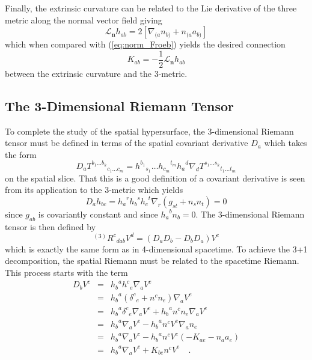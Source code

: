 \documentclass[twocolumn]{article}
\def\.{{\quad .}}
\begin{document}
Finally, the extrinsic curvature can be related to the Lie derivative of the
three metric along the normal vector field giving
\[
   {\mathcal L}_{\mathbf{n}} h_{ab} = 2 \left[ \nabla_{(a} n_{b)} + n_{(a}a_{b)} \right]
\]
which when compared with (\ref{eq:norm_Froeb}) yields the desired connection
\begin{equation}\label{eq:Lie_K}
   K_{ab} = - \frac{1}{2} {\mathcal L}_{\mathbf{n}} h_{ab}
\end{equation}
between the extrinsic curvature and the 3-metric.


\subsection{The 3-Dimensional Riemann Tensor}
To complete the study of the spatial hypersurface, the 3-dimensional Riemann
tensor must be defined in terms of the spatial covariant derivative $D_a$ which
takes the form
\[
   D_a {T^{b_1 \ldots b_k}}_{c_1 \ldots c_m} = {h^{b_1}}_{s_1}
                                               \ldots {h_{c_m}}^{t_m} {h_a}^{d}
                                               \nabla_d
                                               {T^{s_1 \ldots s_k}}_{t_1 \ldots t_m}
\]
on the spatial slice.  That this is a good definition of a covariant derivative
is seen from its application to the 3-metric which yields
\[
   D_a h_{bc} = {h_a}^{r} {h_b}^s {h_c}^t \nabla_r
                \left( g_{st} + n_s n_t \right) = 0
\]
since $g_{ab}$ is covariantly constant and since ${h_a}^b n_b = 0$.  The
3-dimensional Riemann tensor is then defined by
\begin{equation}\label{eq:3_d_Riemann}
   {}^{(3)}{R^c}_{dab} V^d = \left( D_{a}D_{b} - D_{b}D_{a} \right) V^c
\end{equation}
which is exactly the same form as in 4-dimensional spacetime.  To achieve the
3+1 decomposition, the spatial Riemann must be related to the spacetime Riemann.
This process starts with the term
\begin{eqnarray*}
D_b V^c & = & {h_b}^a {h^c}_e \nabla _a V^e \\
        & = & {h_b}^a \left( {\delta ^c}_e + n^c n_e  \right) \nabla _a V^e \\
        & = & {h_b}^a {\delta ^c}_e \nabla _a V^e + {h_b}^a n^c n_e \nabla _a V^e \\
        & = & {h_b}^a \nabla _a V^c - {h_b}^a n^c V^e \nabla _a n_e \\
        & = & {h_b}^a \nabla _a V^c - {h_b}^a n^c V^e
              \left( -K_{ae} - n_a a_e \right) \\
        & = & {h_b}^a \nabla _a V^c + K_{be} n^c V^e \.
\end{eqnarray*}
\end{document}
